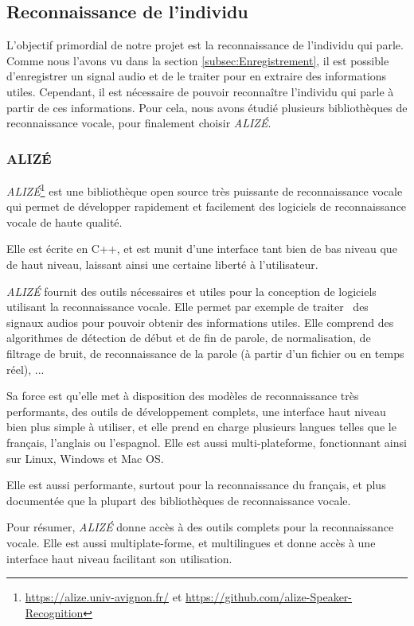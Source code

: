 
\subsection{Reconnaissance de l'individu}
\label{subsec:Reconnaissance_individu}

L'objectif primordial de notre projet est la reconnaissance de l'individu qui parle. Comme nous l'avons vu dans la section \ref{subsec:Enregistrement}, il est
possible d'enregistrer un signal audio et de le traiter pour en extraire des informations utiles. Cependant, il est nécessaire de pouvoir reconnaître
l'individu qui parle à partir de ces informations. Pour cela, nous avons étudié plusieurs bibliothèques de reconnaissance vocale, pour finalement choisir
\textit{ALIZÉ}.


\subsubsection{ALIZÉ}
\textit{ALIZÉ}\footnote{\url{https://alize.univ-avignon.fr/} et \url{https://github.com/alize-Speaker-Recognition}} est une bibliothèque open source très
puissante de reconnaissance vocale qui permet de développer rapidement et facilement des logiciels de reconnaissance vocale de haute qualité.

Elle est écrite en C++, et est munit d'une interface tant bien de bas niveau que de haut niveau, laissant ainsi une certaine liberté à l'utilisateur.


\textit{ALIZÉ} fournit des outils nécessaires et utiles pour la conception de logiciels utilisant la reconnaissance vocale. Elle permet par exemple de traiter \
des signaux audios pour pouvoir obtenir des informations utiles. Elle comprend des algorithmes de détection de début et de fin de parole, de normalisation, de
filtrage de bruit, de reconnaissance de la parole (à partir d'un fichier ou en temps réel), ...

Sa force est qu'elle met à disposition des modèles de reconnaissance très performants, des outils de développement complets, une interface haut niveau bien
plus simple à utiliser, et elle prend en charge plusieurs langues telles que le français, l'anglais ou l'espagnol. Elle est aussi multi-plateforme,
fonctionnant ainsi sur Linux, Windows et Mac OS.

Elle est aussi performante, surtout pour la reconnaissance du français, et plus documentée que la plupart des bibliothèques de reconnaissance vocale.

Pour résumer, \textit{ALIZÉ} donne accès à des outils complets pour la reconnaissance vocale. Elle est aussi multiplate-forme, et multilingues et donne accès
à une interface haut niveau facilitant son utilisation.

